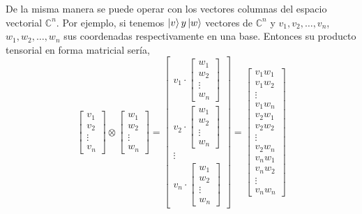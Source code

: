 \documentclass[a4paper]{article}
\numberwithin{equation}{section}
\begin{document}
De la misma manera se puede operar con los vectores columnas del espacio vectorial $\mathbb{C}^n$. Por ejemplo, si tenemos $\ket{v} y \ket{w}$ vectores de $\mathbb{C}^n$ y $v_1, v_2, \ldots, v_n$, $w_1, w_2, \ldots, w_n$ sus coordenadas respectivamente en una base. Entonces su producto tensorial en forma matricial sería,
\begin{equation}
\begin{bmatrix}
	v_1 \\ v_2 \\ \vdots \\ v_n
\end{bmatrix} \otimes
\begin{bmatrix}
	w_1 \\ w_2 \\ \vdots \\ w_n
\end{bmatrix} =
\begin{bmatrix}
	v_1 \cdot \begin{bmatrix}
		w_1 \\ w_2 \\ \vdots \\ w_n
	\end{bmatrix} \\
	v_2 \cdot \begin{bmatrix}
		w_1 \\ w_2 \\ \vdots \\ w_n
	\end{bmatrix} \\
	\vdots \\
	v_n \cdot \begin{bmatrix}
		w_1 \\ w_2 \\ \vdots \\ w_n
	\end{bmatrix}
\end{bmatrix} =
\begin{bmatrix}
v_1w_1 \\ v_1w_2 \\ \vdots \\ v_1w_n \\
v_2w_1 \\ v_2w_2 \\ \vdots \\ v_2w_n \\
v_nw_1 \\ v_nw_2 \\ \vdots \\ v_nw_n
\end{bmatrix}
\end{equation}
\end{document}
